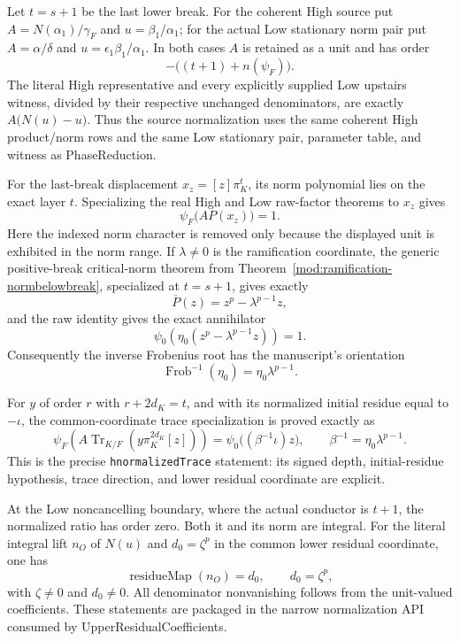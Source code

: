 \begin{lemma}
\label{mod:cases-wildodd-upperresidualnormalization}
Let $t=s+1$ be the last lower break.  For the coherent High source put
$A=N(\alpha _1)/\gamma_F$ and $u=\beta _1/\alpha _1$; for the actual Low
stationary norm pair put $A=\alpha/\delta$ and
$u=\epsilon _1\beta _1/\alpha _1$.  In both cases $A$ is retained as a unit
and has order
\[
 -\bigl((t+1)+n(\psi_F)\bigr).
\]
The literal High representative and every explicitly supplied Low upstairs
witness, divided by their respective unchanged denominators, are exactly
$A\bigl(N(u)-u\bigr)$.  Thus the source normalization uses the same
coherent High product/norm rows and the same Low stationary pair, parameter
table, and witness as PhaseReduction.

For the last-break displacement $x_z=[z]\pi_K^t$, its norm polynomial lies
on the exact layer $t$.  Specializing the real High and Low raw-factor
theorems to $x_z$ gives
\[
 \psi_F\bigl(A P(x_z)\bigr)=1.
\]
Here the indexed norm character is removed only because the displayed unit
is exhibited in the norm range.  If $\lambda\ne0$ is the ramification
coordinate, the generic positive-break critical-norm theorem from
Theorem~\ref{mod:ramification-normbelowbreak}, specialized at $t=s+1$,
gives exactly
\[
 \overline P(z)=z^p-\lambda^{p-1}z,
\]
and the raw identity gives the exact annihilator
\[
 \psi_0\!\left(\eta_0
   (z^p-\lambda^{p-1}z)\right)=1.
\]
Consequently the inverse Frobenius root has the manuscript's orientation
\[
 \operatorname{Frob}^{-1}(\eta_0)=\eta_0\lambda^{p-1}.
\]

For $y$ of order $r$ with $r+2d_K=t$, and with its normalized initial
residue equal to $-\iota$, the common-coordinate trace specialization is
proved exactly as
\[
 \psi_F\!\left(A\operatorname{Tr}_{K/F}
   (y\pi_K^{2d_K}[z])\right)
 =\psi_0\bigl((\beta^{-1}\iota)z\bigr),
 \qquad
 \beta^{-1}=\eta_0\lambda^{p-1}.
\]
This is the precise \texttt{hnormalizedTrace} statement: its signed depth,
initial-residue hypothesis, trace direction, and lower residual coordinate
are explicit.

At the Low noncancelling boundary, where the actual conductor is $t+1$, the
normalized ratio has order zero.  Both it and its norm are integral.  For the
literal integral lift $n_O$ of $N(u)$ and
$d_0=\zeta^p$ in the common lower residual coordinate, one has
\[
  \operatorname{residueMap}(n_O)=d_0,
  \qquad d_0=\zeta^p,
\]
with $\zeta\ne0$ and $d_0\ne0$.  All denominator nonvanishing follows from
the unit-valued coefficients.  These statements are packaged in the narrow
normalization API consumed by UpperResidualCoefficients.


\end{lemma}
